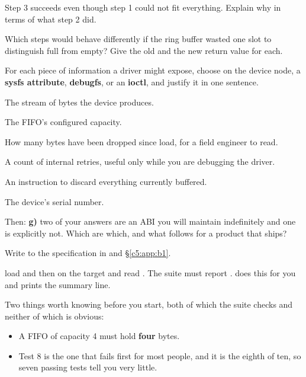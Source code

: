  Step 3 succeeds even though step 1 could not fit everything. Explain why in terms of what
step 2 did.

 Which steps would behave differently if the ring buffer wasted one slot to distinguish
full from empty? Give the old and the new return value for each.

\label{c5:ex:5}

For each piece of information a driver might expose, choose  on the device node, a
\textbf{sysfs attribute}, \textbf{debugfs}, or an \textbf{ioctl}, and justify it in one sentence.

 The stream of bytes the device produces.

 The FIFO's configured capacity.

 How many bytes have been dropped since load, for a field engineer to read.

 A count of internal retries, useful only while you are debugging the driver.

 An instruction to discard everything currently buffered.

 The device's serial number.

Then: \textbf{g)} two of your answers are an ABI you will maintain indefinitely and one is
explicitly not. Which are which, and what follows for a product that ships?

\label{c5:ex:6}

Write  to the specification in 
and \S\ref{c5:app:b1}.

\checkyourself load  and then  on the target and read
. The suite must report .  does this for you
and prints the summary line.

Two things worth knowing before you start, both of which the suite checks and neither of which is
obvious:
\begin{itemize}
  \item A FIFO of capacity 4 must hold \textbf{four} bytes.
  \item Test 8 is the one that fails first for most people, and it is the eighth of ten, so seven
    passing tests tell you very little.
\end{itemize}

